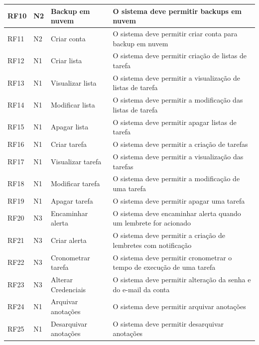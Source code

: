 \documentclass[
	12pt,				%
	oneside,			%
	a4paper,			%
	english,			%
	brazil,				%
	]{abntex2}
\begin{document}
\begin{longtable}{@{}lllp{}@{}}
RF10 & N2 & Backup em nuvem & O sistema deve permitir backups em nuvem  \label{RF10} \\ \midrule
RF11 & N2 & Criar conta & O sistema deve permitir criar conta para backup em nuvem  \label{RF11} \\ \midrule
RF12 & N1 & Criar lista & O sistema deve permitir criação de listas de tarefa  \label{RF12} \\ \midrule
RF13 & N1 & Visualizar lista & O sistema deve permitir a visualização de listas de tarefa  \label{RF13} \\ \midrule
RF14 & N1 & Modificar lista & O sistema deve permitir a modificação das listas de tarefa  \label{RF14} \\ \midrule
RF15 & N1 & Apagar lista & O sistema deve permitir apagar listas de tarefa  \label{RF15} \\ \midrule
RF16 & N1 & Criar tarefa & O sistema deve permitir a criação de tarefas  \label{RF16} \\ \midrule
RF17 & N1 & Visualizar tarefa & O sistema deve permitir a visualização das tarefas  \label{RF17} \\ \midrule
RF18 & N1 & Modificar tarefa & O sistema deve permitir a modificação de uma tarefa  \label{RF18} \\ \midrule
RF19 & N1 & Apagar tarefa & O sistema deve permitir apagar uma tarefa  \label{RF19} \\ \midrule
RF20 & N3 & Encaminhar alerta & O sistema deve encaminhar alerta quando um lembrete for acionado  \label{RF20} \\ \midrule
RF21 & N3 & Criar alerta & O sistema deve permitir a criação de lembretes com notificação  \label{RF21} \\ \midrule
RF22 & N3 & Cronometrar tarefa & O sistema deve permitir cronometrar o tempo de execução de uma tarefa  \label{RF22} \\ \midrule
RF23 & N3 & Alterar Credenciais & O sistema deve permitir alteração da senha e do e-mail da conta \label{RF23} \\ \midrule
RF24 & N1 & Arquivar anotações & O sistema deve permitir arquivar anotações  \label{RF24} \\ \midrule 
RF25 & N1 & Desarquivar anotações & O sistema deve permitir desarquivar anotações  \label{RF25} \\ \bottomrule
\end{longtable}
\end{document}
